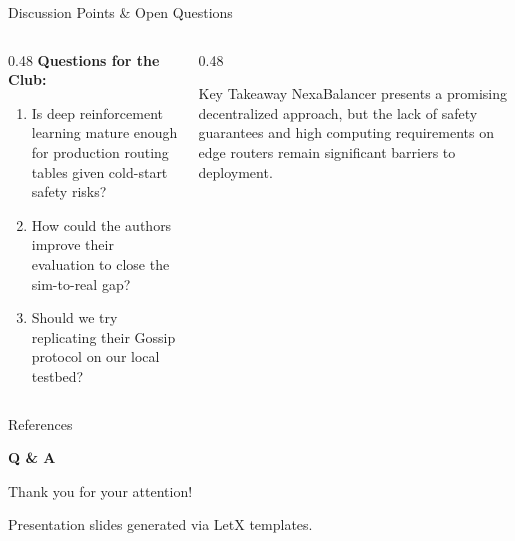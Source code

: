 \begin{frame}{Discussion Points \& Open Questions}
  \begin{columns}[T]
    \begin{column}{0.48\textwidth}
      \textbf{Questions for the Club:}
      \begin{enumerate}
        \item Is deep reinforcement learning mature enough for production routing tables given cold-start safety risks?
        \item How could the authors improve their evaluation to close the sim-to-real gap?
        \item Should we try replicating their Gossip protocol on our local testbed?
      \end{enumerate}
    \end{column}
    
    \begin{column}{0.48\textwidth}
      \begin{highlightbox}{Key Takeaway}
        NexaBalancer presents a promising decentralized approach, but the lack of safety guarantees and high computing requirements on edge routers remain significant barriers to deployment.
      \end{highlightbox}
    \end{column}
  \end{columns}
\end{frame}

\begin{frame}{References}
  \nocite{*}
  
  
\end{frame}

{%
\begin{frame}[plain]
  \begin{center}
    \textcolor{secondary}{\Huge\textbf{Q \& A}}
    \vspace{0.6cm}
    
    {\large Thank you for your attention!}
    
    \vspace{1cm}
    \textcolor{textmuted}{\small Presentation slides generated via LetX templates.}
  \end{center}
\end{frame}
}
